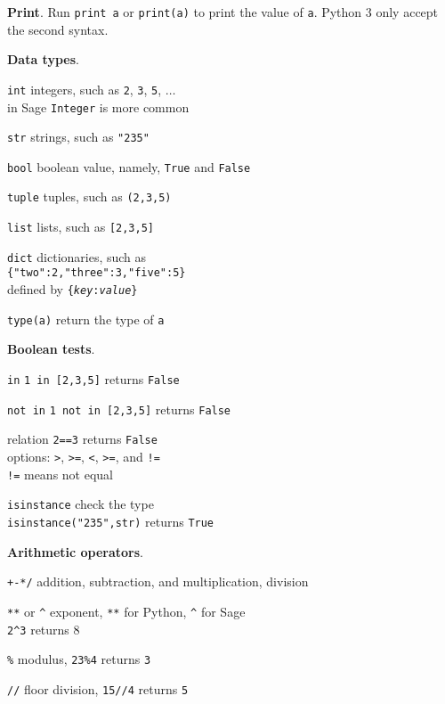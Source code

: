 \documentclass{article}
\newcommand{\heading}[1]{\medskip\textbf{#1}.}
\newenvironment{lwdes}{\begin{description}[leftmargin=1.7cm,align=left,labelwidth=1.5cm]}{\end{description}}
\begin{document}
\begin{multicols}{2}
\heading{Print}
Run \texttt{print a} or \texttt{print(a)} to print the value of \texttt{a}.  Python 3 only accept the second syntax.

\heading{Data types}
\begin{lwdes}
\item[\texttt{int}] integers, such as \texttt{2}, \texttt{3}, \texttt{5}, $\ldots$\\
in Sage \texttt{Integer} is more common
\item[\texttt{str}] strings, such as \texttt{"235"}
\item[\texttt{bool}] boolean value, namely, \texttt{True} and \texttt{False}
\item[\texttt{tuple}] tuples, such as \texttt{(2,3,5)}
\item[\texttt{list}] lists, such as \texttt{[2,3,5]}
\item[\texttt{dict}] dictionaries, such as \\\texttt{\{"two":2,"three":3,"five":5\}} \\defined by \texttt{\{\textit{key}:\textit{value}\}}
\item[\texttt{type(a)}] return the type of \texttt{a}
\end{lwdes}

\heading{Boolean tests}
\begin{lwdes}
\item[\texttt{in}] \texttt{1 in [2,3,5]} returns \texttt{False}
\item[\texttt{not in}] \texttt{1 not in [2,3,5]} returns \texttt{False}
\item[relation] \texttt{2==3} returns \texttt{False}\\
options: \texttt{>}, \texttt{>=}, \texttt{<}, \texttt{>=}, and \texttt{!=}\\
\texttt{!=} means not equal
\item[\texttt{isinstance}] check the type\\
\texttt{isinstance("235",str)} returns \texttt{True}
\end{lwdes}

\heading{Arithmetic operators}
\begin{lwdes}
\item[\texttt{+-*/}] addition, subtraction, and multiplication, division
\item[\texttt{**} or \texttt{\textasciicircum}] exponent, \texttt{**} for Python, \texttt{\textasciicircum} for Sage\\
\texttt{2\textasciicircum3} returns 8
\item[\texttt{\%}] modulus, \texttt{23\%4} returns \texttt{3}
\item[\texttt{\slash\slash}] floor division, \texttt{15\slash\slash4} returns \texttt{5} 
\end{lwdes}


\end{multicols}
\end{document}
